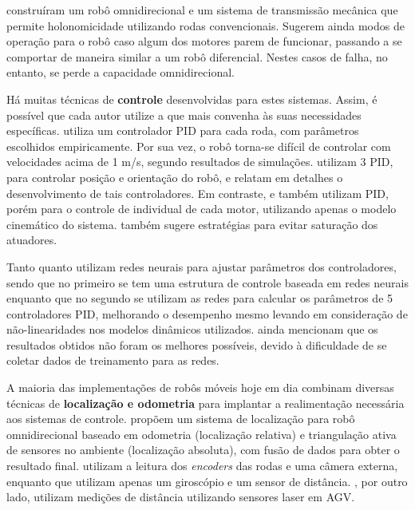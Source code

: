 \cite{jung2001fault} construíram um robô omnidirecional e um sistema de transmissão mecânica que permite holonomicidade utilizando rodas convencionais. Sugerem ainda modos de operação para o robô caso algum dos motores parem de funcionar, passando a se comportar de maneira similar a um robô diferencial. Nestes casos de falha, no entanto, se perde a capacidade omnidirecional.

Há muitas técnicas de \textbf{controle} desenvolvidas para estes sistemas. Assim, é possível que cada autor utilize a que mais convenha às suas necessidades específicas. \cite{ritter2016modelagem} utiliza um controlador PID para cada roda, com parâmetros escolhidos empiricamente. Por sua vez, o robô torna-se difícil de controlar com velocidades acima de 1 m/s, segundo resultados de simulações. \cite{samani2007comprehensive} utilizam 3 PID, para controlar posição e orientação do robô, e relatam em detalhes o desenvolvimento de tais controladores. Em contraste, \cite{rojas2006holonomic} e \cite{indiveri2009swedish} também utilizam PID, porém para o controle de individual de cada motor, utilizando apenas o modelo cinemático do sistema. \cite{indiveri2009swedish} também sugere estratégias para evitar saturação dos atuadores.

Tanto \cite{treesatayapun2011discrete} quanto \cite{oubbati2005velocity} utilizam redes neurais para ajustar parâmetros dos controladores, sendo que no primeiro se tem uma estrutura de controle baseada em redes neurais enquanto que no segundo se utilizam as redes para calcular os parâmetros de 5 controladores PID, melhorando o desempenho mesmo levando em consideração de não-linearidades nos modelos dinâmicos utilizados. \cite{oubbati2005velocity} ainda mencionam que os resultados obtidos não foram os melhores possíveis, devido à dificuldade de se coletar dados de treinamento para as redes.

A maioria das implementações de robôs móveis hoje em dia combinam diversas técnicas de \textbf{localização e odometria} para implantar a realimentação necessária aos sistemas de controle. \cite{ginzburg2013indoor} propõem um sistema de localização para robô omnidirecional baseado em odometria (localização relativa) e triangulação ativa de sensores no ambiente (localização absoluta), com fusão de dados para obter o resultado final. \cite{rojas2006holonomic} utilizam a leitura dos \emph{encoders} das rodas e uma câmera externa, enquanto que \cite{garcia2015gyro} utilizam apenas um giroscópio e um sensor de distância. \cite{rohrig2010laser}, por outro lado, utilizam medições de distância utilizando sensores laser em AGV.


